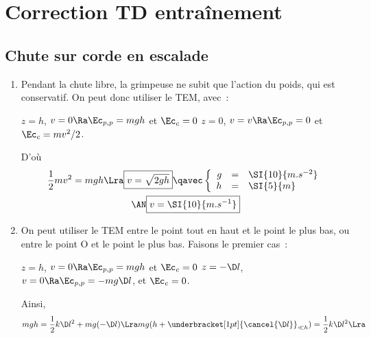 \documentclass[a4paper, 12pt, final, garamond]{book}
\begin{document}
\setcounter{chapter}{3}

\chapter{Correction TD entra\^inement}
\section{Chute sur corde en escalade}
\begin{enumerate}
    \item Pendant la chute libre, la grimpeuse ne subit que l'action du poids,
        qui est conservatif. On peut donc utiliser le TEM, avec~:
        \begin{itemize}[label=$\diamond$]
             $z = h$, $v=0 \Ra \Ec_{p,p} = mgh$ et
                $\Ec_c = 0$
             $z = 0$, $v=v \Ra \Ec_{p,p} = 0$ et
                $\Ec_c = mv^2/2$.
        \end{itemize}
        D'où
        \begin{gather*}
            \frac{1}{2}mv^2 = mgh
            \Lra
            \boxed{v = \sqrt{2gh}}
            \qavec
            \left\{
                \begin{array}{rcl}
                    g & = & \SI{10}{m.s^{-2}}\\
                    h & = & \SI{5}{m}
                \end{array}
            \right.\\
            \AN
            \boxed{v = \SI{10}{m.s^{-1}}}
        \end{gather*}
    \item On peut utiliser le TEM entre le point tout en haut et le point le
        plus bas, ou entre le point O et le point le plus bas. Faisons le
        premier cas~:
        \begin{itemize}[label=$\diamond$]
             $z = h$, $v=0 \Ra \Ec_{p,p} = mgh$ et
                $\Ec_c = 0$
             $z = -\D l$, $v=0 \Ra \Ec_{p,p}
                = -mg\D l$,  et $\Ec_c = 0$.
        \end{itemize}
        Ainsi,
        \begin{gather*}
            mgh = \frac{1}{2}k\D l^2 + mg(-\D l)
            \Lra
            mg(h+\underbracket[1pt]{\cancel{\D l}}_{\ll h}) = \frac{1}{2}k\D l^2
            \Lra

\end{gather*}
\end{enumerate}
\end{document}

